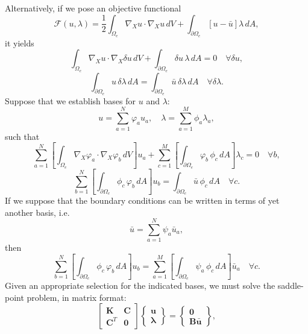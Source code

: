 Alternatively, if we pose an objective functional
\begin{equation}
	\mathcal{F}(u,\lambda) = \frac{1}{2} \int_{\Omega_e} \nabla_X u \cdot \nabla_X u \, dV + \int_{\partial \Omega_e} \left[ u - \bar{u} \right] \lambda \, dA,
\end{equation}
it yields
\begin{equation}
	\int_{\Omega_e} \nabla_X u \cdot \nabla_X \delta u \, dV + \int_{\partial \Omega_e} \delta u \, \lambda \, dA = 0 \quad \forall \delta u,
\end{equation}
\begin{equation}
	\int_{\partial \Omega_e} u \, \delta \lambda \, dA = \int_{\partial \Omega_e} \bar{u} \, \delta \lambda \, dA \quad \forall \delta \lambda.
\end{equation}
Suppose that we establish bases for $u$ and $\lambda$:
\begin{equation}
	u = \sum_{a=1}^{N} \varphi_a u_a, \quad \lambda = \sum_{a=1}^{M} \phi_a \lambda_a,
\end{equation}
such that
\begin{equation}
	\sum_{a=1}^N \left[ \int_{\Omega_e} \nabla_X \varphi_a \cdot \nabla_X \varphi_b \, dV \right] u_a + \sum_{c=1}^M \left[ \int_{\partial \Omega_e} \varphi_b \, \phi_c \, dA \right] \lambda_c = 0 \quad \forall b,
\end{equation}
\begin{equation}
	\sum_{b=1}^N \left[ \int_{\partial \Omega_e} \phi_c \, \varphi_b \, dA \right] u_b = \int_{\partial \Omega_e} \bar{u} \, \phi_c \, dA \quad \forall c.
\end{equation}
If we suppose that the boundary conditions can be written in terms of yet another basis, i.e.
\begin{equation}
	\bar{u} = \sum_{a=1}^N \psi_a \bar{u}_a,
\end{equation}
then
\begin{equation}
	\sum_{b=1}^N \left[ \int_{\partial \Omega_e} \phi_c \, \varphi_b \, dA \right] u_b = \sum_{a=1}^M \left[ \int_{\partial \Omega_e} \psi_a \, \phi_c \, dA \right] \bar{u}_a \quad \forall c.
\end{equation}
Given an appropriate selection for the indicated bases, we must solve the saddle-point problem, in matrix format:
\begin{equation}
	\left[ \begin{array}{cc} \mathbf{K} & \mathbf{C} \\ \mathbf{C}^T & \mathbf{0} \end{array} \right] \left\{ \begin{array}{c} \mathbf{u} \\ \boldsymbol{\lambda} \end{array} \right\} = \left\{ \begin{array}{c} \mathbf{0} \\ \mathbf{B} \bar{\mathbf{u}} \end{array} \right\},
\end{equation}
